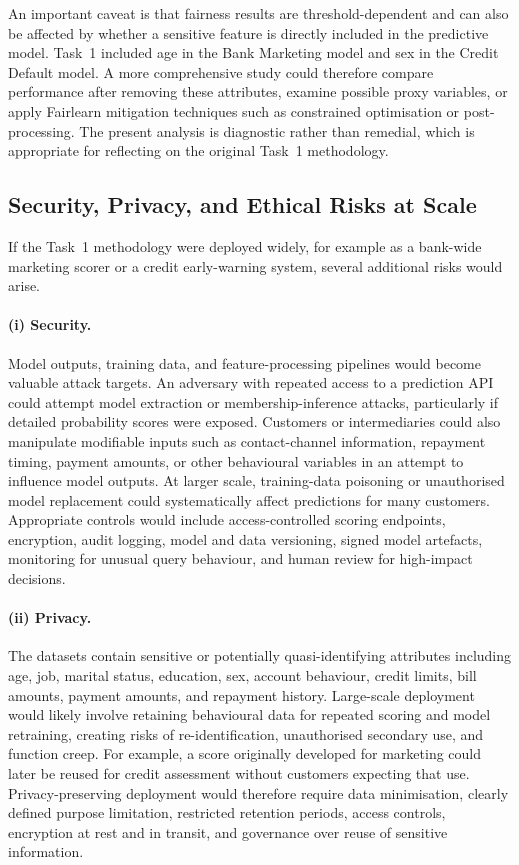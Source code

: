 \documentclass[11pt,a4paper]{article}
\begin{document}
An important caveat is that fairness results are threshold-dependent and can also be
affected by whether a sensitive feature is directly included in the predictive model.
Task~1 included age in the Bank Marketing model and sex in the Credit Default model.
A more comprehensive study could therefore compare performance after removing these
attributes, examine possible proxy variables, or apply Fairlearn mitigation techniques
such as constrained optimisation or post-processing. The present analysis is
diagnostic rather than remedial, which is appropriate for reflecting on the original
Task~1 methodology.


\subsection{Security, Privacy, and Ethical Risks at Scale}
\label{sec:part2-risks}

If the Task~1 methodology were deployed widely, for example as a bank-wide marketing
scorer or a credit early-warning system, several additional risks would arise.

\paragraph{(i) Security.}
Model outputs, training data, and feature-processing pipelines would become valuable
attack targets. An adversary with repeated access to a prediction API could attempt
model extraction or membership-inference attacks, particularly if detailed probability
scores were exposed. Customers or intermediaries could also manipulate modifiable
inputs such as contact-channel information, repayment timing, payment amounts, or
other behavioural variables in an attempt to influence model outputs. At larger scale,
training-data poisoning or unauthorised model replacement could systematically affect
predictions for many customers. Appropriate controls would include access-controlled
scoring endpoints, encryption, audit logging, model and data versioning, signed model
artefacts, monitoring for unusual query behaviour, and human review for high-impact
decisions.

\paragraph{(ii) Privacy.}
The datasets contain sensitive or potentially quasi-identifying attributes including
age, job, marital status, education, sex, account behaviour, credit limits, bill
amounts, payment amounts, and repayment history. Large-scale deployment would likely
involve retaining behavioural data for repeated scoring and model retraining, creating
risks of re-identification, unauthorised secondary use, and function creep. For
example, a score originally developed for marketing could later be reused for credit
assessment without customers expecting that use. Privacy-preserving deployment would
therefore require data minimisation, clearly defined purpose limitation, restricted
retention periods, access controls, encryption at rest and in transit, and governance
over reuse of sensitive information.
\end{document}
